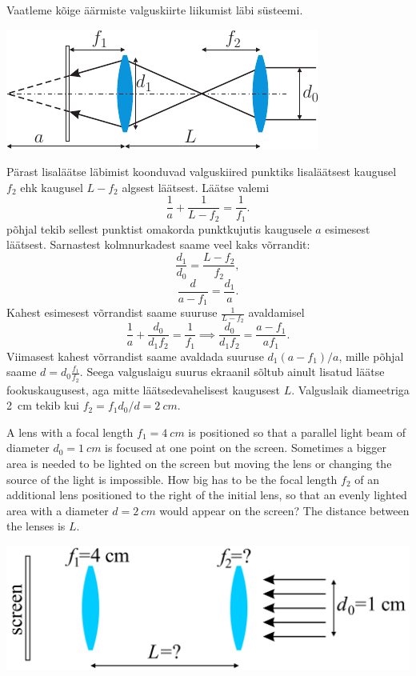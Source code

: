 {\ifSolution
Vaatleme kõige äärmiste valguskiirte liikumist läbi süsteemi. 
\begin{center}
\includegraphics[scale=1.5]{2015-v3g-02-valgustamine-lah}
\end{center}
Pärast lisaläätse läbimist koonduvad valguskiired punktiks lisaläätsest kaugusel $f_2$ ehk kaugusel $L-f_2$ algsest läätsest. Läätse valemi 
\begin{equation}
\frac{1}{a}+\frac{1}{L-f_2}=\frac{1}{f_1}.
\end{equation}
põhjal tekib sellest punktist omakorda punktkujutis kaugusele $a$ esimesest läätsest. Sarnastest kolmnurkadest saame veel kaks võrrandit:
\begin{equation}
\frac{d_1}{d_0}=\frac{L-f_2}{f_2},
\end{equation}
\begin{equation}
\frac{d}{a-f_1}=\frac{d_1}{a}.
\end{equation}
Kahest esimesest võrrandist saame suuruse $\frac{1}{L-f_2}$ avaldamisel
\begin{equation}
\frac{1}{a}+\frac{d_0}{d_1f_2}=\frac{1}{f_1}\implies \frac{d_0}{d_1f_2}=\frac{a-f_1}{af_1}.
\end{equation}
Viimasest kahest võrrandist saame avaldada suuruse $d_1(a-f_1)/a$, mille põhjal saame $d=d_0\frac{f_1}{f_2}.$ Seega valguslaigu suurus ekraanil sõltub ainult lisatud läätse fookuskaugusest, aga mitte läätsedevahelisest kaugusest $L$. Valguslaik diameetriga \SI{2}{cm} tekib kui $f_2=f_1d_0/d=\SI{2}{cm}$.
\fi


\ifEngStatement
A lens with a focal length $f_1=\SI{4}{cm}$ is positioned so that a parallel light beam of diameter $d_0=\SI{1}{cm}$ is focused at one point on the screen. Sometimes a bigger area is needed to be lighted on the screen but moving the lens or changing the source of the light is impossible. How big has to be the focal length $f_2$ of an additional lens positioned to the right of the initial lens, so that an evenly lighted area with a diameter $d=\SI{2}{cm}$ would appear on the screen? The distance between the lenses is $L$.
\begin{center}
\includegraphics[scale=1.5]{2015-v3g-02-valgustamine-yles_ing}
\end{center}
\fi


}
